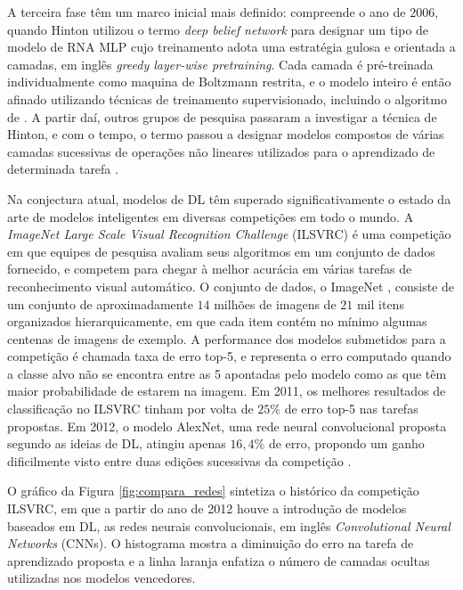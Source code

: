 A terceira fase têm um marco inicial mais definido: compreende o ano de $2006$, quando Hinton utilizou o termo \emph{deep belief network} para designar um tipo de modelo de RNA MLP cujo treinamento adota uma estratégia gulosa e orientada a camadas, em inglês \emph{greedy layer-wise pretraining}. Cada camada é pré-treinada individualmente como maquina de Boltzmann restrita, e o modelo inteiro é então afinado utilizando técnicas de treinamento supervisionado, incluindo o algoritmo de . A partir daí, outros grupos de pesquisa passaram a investigar a técnica de Hinton, e com o tempo, o termo passou a designar modelos compostos de várias camadas sucessivas de operações não lineares utilizados para o aprendizado de determinada tarefa \cite{hinton2006fast, hinton2007learning, goodfellow2016deep, deng2014deep}.

Na conjectura atual, modelos de DL têm superado significativamente o estado da arte de modelos inteligentes em diversas competições em todo o mundo. A \emph{ImageNet Large Scale Visual Recognition Challenge} (ILSVRC) \cite{Imagenet} é uma competição em que equipes de pesquisa avaliam seus algoritmos em um conjunto de dados fornecido, e competem para chegar à melhor acurácia em várias tarefas de reconhecimento visual automático. O conjunto de dados, o ImageNet \cite{Imagenet}, consiste de um conjunto de aproximadamente $14$ milhões de imagens de $21$ mil itens organizados hierarquicamente, em que cada item contém no mínimo algumas centenas de imagens de exemplo. A performance dos modelos submetidos para a competição é chamada taxa de erro top-5, e representa o erro computado quando a classe alvo não se encontra entre as 5 apontadas pelo modelo como as que têm maior probabilidade de estarem na imagem. Em 2011, os melhores resultados de  classificação no ILSVRC tinham por volta de $25\%$ de erro top-5 nas tarefas propostas. Em 2012, o modelo AlexNet, uma rede neural convolucional proposta segundo as ideias de DL, atingiu apenas $16,4\%$ de erro, propondo um ganho dificilmente visto entre duas edições sucessivas da competição \cite{ImagenetChall:2012}.

O gráfico da Figura \ref{fig:compara_redes} sintetiza o histórico da competição ILSVRC, em que a partir do ano de 2012 houve a introdução de modelos baseados em DL, as redes neurais convolucionais, em inglês \emph{Convolutional Neural Networks} (CNNs). O histograma mostra a diminuição do erro na tarefa de aprendizado proposta e a linha laranja enfatiza o número de camadas ocultas utilizadas nos modelos vencedores.

